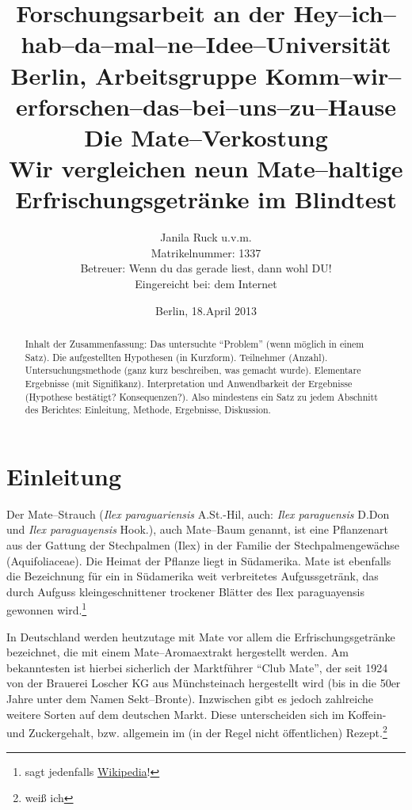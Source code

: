 \documentclass[11pt,a4paper,ngerman]{article}
\title{
{\normalsize Forschungsarbeit an der Hey--ich--hab--da--mal--ne--Idee--Universität\\
Berlin, Arbeitsgruppe Komm--wir--erforschen--das--bei--uns--zu--Hause}\\[6ex] 
\textbf{Die Mate--Verkostung}\\
\normalsize{Wir vergleichen neun Mate--haltige Erfrischungsgetränke im Blindtest}}
\author{Janila Ruck u.v.m.\\
{\normalsize Matrikelnummer: 1337}\\
{\normalsize Betreuer: Wenn du das gerade liest, dann wohl DU!}\\
{\normalsize Eingereicht bei: dem Internet}}
\date{Berlin, 18.April 2013}
\begin{document}
\begin{titlepage}
\maketitle
\thispagestyle{empty}

\vfill{}

\begin{abstract}
Inhalt der Zusammenfassung: Das untersuchte "`Problem"' (wenn möglich in einem Satz). Die aufgestellten Hypothesen (in Kurzform). Teilnehmer (Anzahl). Untersuchungsmethode (ganz kurz beschreiben, was gemacht wurde). Elementare Ergebnisse (mit Signifikanz). Interpretation und Anwendbarkeit der Ergebnisse (Hypothese bestätigt? Konsequenzen?). Also mindestens ein Satz zu jedem Abschnitt des Berichtes: Einleitung, Methode, Ergebnisse, Diskussion.
\end{abstract}
\end{titlepage}

\pagestyle{empty}
\clearpage{}


\tableofcontents

\clearpage{}
\pagestyle{fancy}
\setcounter{page}{1}
 


\section{Einleitung}\label{sec:einleitung}
Der Mate--Strauch (\textit{Ilex paraguariensis} A.St.-Hil, auch: \textit{Ilex paraguensis} D.Don und \textit{Ilex paraguayensis} Hook.), auch Mate--Baum genannt, ist eine Pflanzenart aus der Gattung der Stechpalmen (Ilex) in der Familie der Stechpalmengewächse (Aquifoliaceae). Die Heimat der Pflanze liegt in Südamerika. Mate ist ebenfalls die Bezeichnung für ein in Südamerika weit verbreitetes Aufgussgetränk, das durch Aufguss kleingeschnittener trockener Blätter des Ilex paraguayensis gewonnen wird.\footnote{sagt jedenfalls \href{http://de.wikipedia.org/wiki/Mate}{Wikipedia}!}

In Deutschland werden heutzutage mit Mate vor allem die Erfrischungsgetränke bezeichnet, die mit einem Mate--Aromaextrakt hergestellt werden. Am bekanntesten ist hierbei sicherlich der Marktführer "`Club Mate"', der seit 1924 von der Brauerei Loscher KG aus Münchsteinach hergestellt wird (bis in die 50er Jahre unter dem Namen Sekt--Bronte). Inzwischen gibt es jedoch zahlreiche weitere Sorten auf dem deutschen Markt. Diese unterscheiden sich im Koffein- und Zuckergehalt, bzw. allgemein im (in der Regel nicht öffentlichen) Rezept.\footnote{weiß ich}
\end{document}
